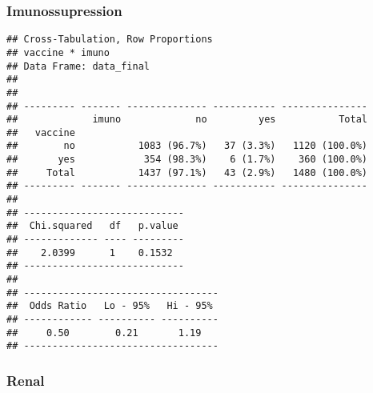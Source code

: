 \documentclass[
]{article}
\newenvironment{Shaded}{\begin{snugshade}}{\end{snugshade}}
\newcommand{\AttributeTok}[1]{\textcolor[rgb]{0.77,0.63,0.00}{#1}}
\newcommand{\ConstantTok}[1]{\textcolor[rgb]{0.00,0.00,0.00}{#1}}
\newcommand{\FunctionTok}[1]{\textcolor[rgb]{0.00,0.00,0.00}{#1}}
\newcommand{\NormalTok}[1]{#1}
\newcommand{\SpecialCharTok}[1]{\textcolor[rgb]{0.00,0.00,0.00}{#1}}
\newcommand{\StringTok}[1]{\textcolor[rgb]{0.31,0.60,0.02}{#1}}
\begin{document}
\hypertarget{imunossupression}{%
\subsubsection{Imunossupression}\label{imunossupression}}

\begin{Shaded}
\end{Shaded}

\begin{verbatim}
## Cross-Tabulation, Row Proportions  
## vaccine * imuno  
## Data Frame: data_final  
## 
## 
## --------- ------- -------------- ----------- ---------------
##             imuno             no         yes           Total
##   vaccine                                                   
##        no           1083 (96.7%)   37 (3.3%)   1120 (100.0%)
##       yes            354 (98.3%)    6 (1.7%)    360 (100.0%)
##     Total           1437 (97.1%)   43 (2.9%)   1480 (100.0%)
## --------- ------- -------------- ----------- ---------------
## 
## ----------------------------
##  Chi.squared   df   p.value 
## ------------- ---- ---------
##    2.0399      1    0.1532  
## ----------------------------
## 
## ----------------------------------
##  Odds Ratio   Lo - 95%   Hi - 95% 
## ------------ ---------- ----------
##     0.50        0.21       1.19   
## ----------------------------------
\end{verbatim}

\hypertarget{renal}{%
\subsubsection{Renal}\label{renal}}

\begin{Shaded}
\end{Shaded}
\end{document}
